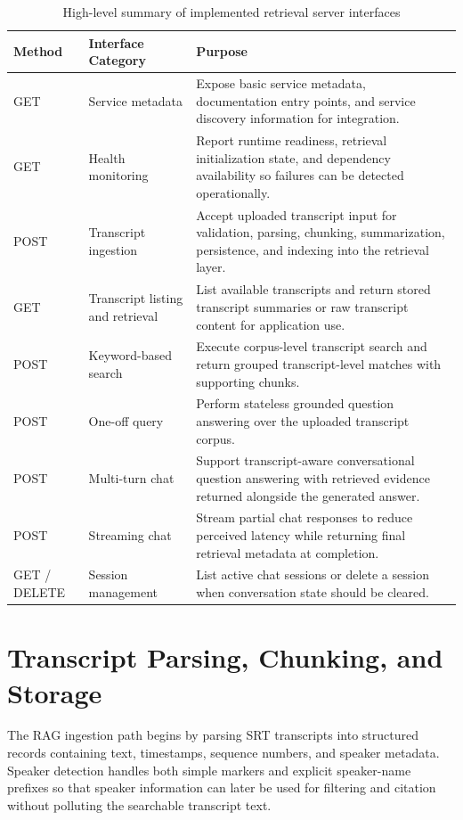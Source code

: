 \begin{table}[H]
  \centering
  \setlength{\tabcolsep}{5pt}
  \renewcommand{\arraystretch}{1.15}
  \begin{tabular}{|l|l|>{\raggedright\arraybackslash}p{}|}
    \hline
    \textbf{Method} & \textbf{Interface Category} & \textbf{Purpose} \\
    \hline
    GET & Service metadata & Expose basic service metadata, documentation entry points, and service discovery information for integration. \\
    \hline
    GET & Health monitoring & Report runtime readiness, retrieval initialization state, and dependency availability so failures can be detected operationally. \\
    \hline
    POST & Transcript ingestion & Accept uploaded transcript input for validation, parsing, chunking, summarization, persistence, and indexing into the retrieval layer. \\
    \hline
    GET & Transcript listing and retrieval & List available transcripts and return stored transcript summaries or raw transcript content for application use. \\
    \hline
    POST & Keyword-based search & Execute corpus-level transcript search and return grouped transcript-level matches with supporting chunks. \\
    \hline
    POST & One-off query & Perform stateless grounded question answering over the uploaded transcript corpus. \\
    \hline
    POST & Multi-turn chat & Support transcript-aware conversational question answering with retrieved evidence returned alongside the generated answer. \\
    \hline
    POST & Streaming chat & Stream partial chat responses to reduce perceived latency while returning final retrieval metadata at completion. \\
    \hline
    GET / DELETE & Session management & List active chat sessions or delete a session when conversation state should be cleared. \\
    \hline
  \end{tabular}
  \caption{High-level summary of implemented retrieval server interfaces}
  \label{tab:retrieval-server-interfaces}
\end{table}

\section{Transcript Parsing, Chunking, and Storage}
The RAG ingestion path begins by parsing SRT transcripts into structured records containing text, timestamps, sequence numbers, and speaker metadata. Speaker detection handles both simple markers and explicit speaker-name prefixes so that speaker information can later be used for filtering and citation without polluting the searchable transcript text.

